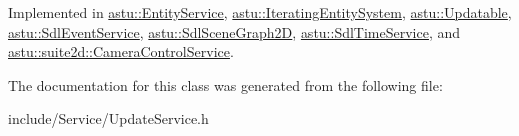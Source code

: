 Implemented in \hyperlink{classastu_1_1EntityService_a70831a8dc185652c2c9056c4e3cc10e0}{astu\+::\+Entity\+Service}, \hyperlink{classastu_1_1IteratingEntitySystem_a7534ceb189ea282024bb9917cc244e94}{astu\+::\+Iterating\+Entity\+System}, \hyperlink{classastu_1_1Updatable_a925566c9770b95895c6c7294f9d51528}{astu\+::\+Updatable}, \hyperlink{classastu_1_1SdlEventService_a67090f42250433506b8bfb4254df9e50}{astu\+::\+Sdl\+Event\+Service}, \hyperlink{classastu_1_1SdlSceneGraph2D_add3a6e67064379389068659addad0920}{astu\+::\+Sdl\+Scene\+Graph2D}, \hyperlink{classastu_1_1SdlTimeService_ada8347f0f665616a2202919e71b76302}{astu\+::\+Sdl\+Time\+Service}, and \hyperlink{classastu_1_1suite2d_1_1CameraControlService_ab547e4f6103448db59d1350695bed4e8}{astu\+::suite2d\+::\+Camera\+Control\+Service}.



The documentation for this class was generated from the following file\+:\begin{DoxyCompactItemize}
\item 
include/\+Service/Update\+Service.\+h\end{DoxyCompactItemize}
